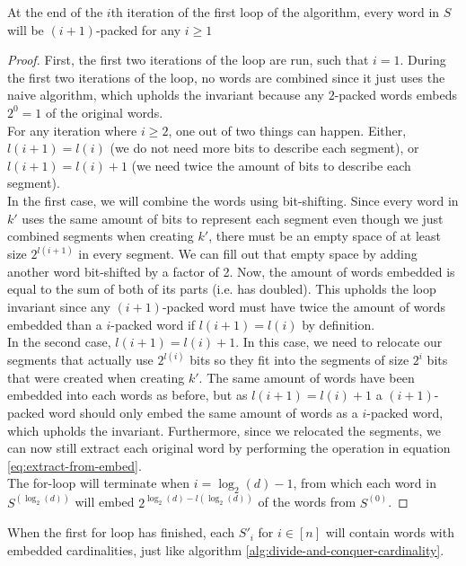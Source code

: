 \begin{invariant}
    At the end of the $i$th iteration of the first loop of the algorithm, every word in $S$ will be $(i+1)$-packed for any $i \geq 1$
\end{invariant}
\begin{proof}
    First, the first two iterations of the loop are run, such that $i=1$. During the first two iterations of the loop, no words are combined since it just uses the naive algorithm, which upholds the invariant because any $2$-packed words embeds $2^{0}=1$ of the original words.\\
    For any iteration where $i\geq 2$, one out of two things can happen. Either, $l(i+1) = l(i)$ (we do not need more bits to describe each segment), or $l(i + 1) = l(i) + 1$ (we need twice the amount of bits to describe each segment).\\
    In the first case, we will combine the words using bit-shifting. Since every word in $k'$ uses the same amount of bits to represent each segment even though we just combined segments when creating $k'$, there must be an empty space of at least size $2^{l(i+1)}$ in every segment. We can fill out that empty space by adding another word bit-shifted by a factor of 2. %
    Now, the amount of words embedded is equal to the sum of both of its parts (i.e. has doubled). This upholds the loop invariant since any $(i+1)$-packed word must have twice the amount of words embedded than a $i$-packed word if $l(i+1) = l(i)$ by definition.\\
    In the second case, $l(i + 1) = l(i) + 1$. In this case, we need to relocate our segments that actually use $2^{l(i)}$ bits so they fit into the segments of size $2^i$ bits that were created when creating $k'$.
    The same amount of words have been embedded into each words as before, but as $l(i+1) = l(i) + 1$ a $(i+1)$-packed word should only embed the same amount of words as a $i$-packed word, which upholds the invariant.
    Furthermore, since we relocated the segments, we can now still extract each original word by performing the operation in equation \ref{eq:extract-from-embed}.\\
    The for-loop will terminate when $i = \log_2(d) - 1$, from which each word in $S^{(\log_2(d))}$ will embed $2^{\log_2(d)-l(\log_2(d))}$ of the words from $S^{(0)}$.
\end{proof}
When the first for loop has finished, each $S'_i$ for $i\in [n]$ will contain words with embedded cardinalities, just like algorithm \ref{alg:divide-and-conquer-cardinality}.

